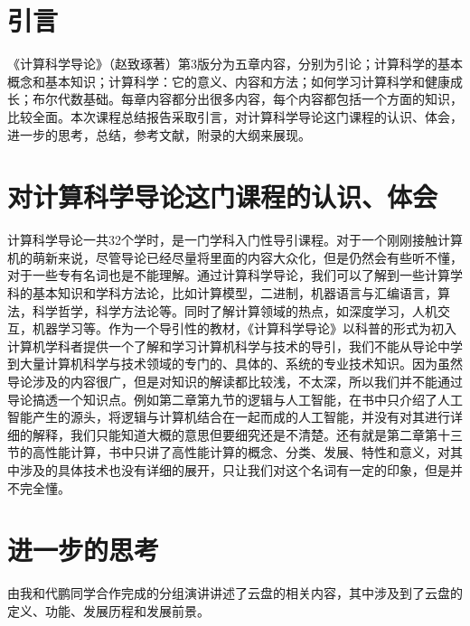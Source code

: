 \documentclass{article}
\begin{document}
\thispagestyle{empty}
\newpage
\setcounter{page}{1}
\section{引言}
《计算科学导论》（赵致琢著）第3版分为五章内容，分别为引论；计算科学的基本概念和基本知识；计算科学：它的意义、内容和方法；如何学习计算科学和健康成长；布尔代数基础。每章内容都分出很多内容，每个内容都包括一个方面的知识，比较全面。本次课程总结报告采取引言，对计算科学导论这门课程的认识、体会，进一步的思考，总结，参考文献，附录的大纲来展现。

\section{对计算科学导论这门课程的认识、体会}
计算科学导论一共32个学时，是一门学科入门性导引课程。对于一个刚刚接触计算机的萌新来说，尽管导论已经尽量将里面的内容大众化，但是仍然会有些听不懂，对于一些专有名词也是不能理解。通过计算科学导论，我们可以了解到一些计算学科的基本知识和学科方法论，比如计算模型，二进制，机器语言与汇编语言，算法，科学哲学，科学方法论等。同时了解计算领域的热点，如深度学习，人机交互，机器学习等。作为一个导引性的教材，《计算科学导论》以科普的形式为初入计算机学科者提供一个了解和学习计算机科学与技术的导引，我们不能从导论中学到大量计算机科学与技术领域的专门的、具体的、系统的专业技术知识。因为虽然导论涉及的内容很广，但是对知识的解读都比较浅，不太深，所以我们并不能通过导论搞透一个知识点。例如第二章第九节的逻辑与人工智能，在书中只介绍了人工智能产生的源头，将逻辑与计算机结合在一起而成的人工智能，并没有对其进行详细的解释，我们只能知道大概的意思但要细究还是不清楚。还有就是第二章第十三节的高性能计算，书中只讲了高性能计算的概念、分类、发展、特性和意义，对其中涉及的具体技术也没有详细的展开，只让我们对这个名词有一定的印象，但是并不完全懂。


\section{进一步的思考}
由我和代鹏同学合作完成的分组演讲讲述了云盘的相关内容，其中涉及到了云盘的定义、功能、发展历程和发展前景。
\end{document}
